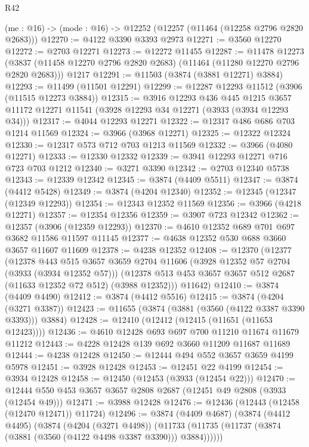 \begin{lexlean}{R42}
\begin{coremodule}
  (me : @16) -> (mode : @16) -> @12252 (@12257 (@11464 (@12258 @2796 @2820 @2683)))
@12270 := @4122 @3390 @3393 @2973
@12271 := @3560 @12270
@12272 := @2703 @12271
@12273 := @12272 @11455
@12287 := @11478
    @12273
    (@3837 (@11458 @12270 @2796 @2820 @2683) (@11464 (@11280 @12270 @2796 @2820 @2683)))
    @1217
@12291 := @11503 (@3874 (@3881 @12271) @3884)
@12293 := @11499 (@11501 @12291)
@12299 := @12287 @12293 @11512 (@3906 (@11515 @12273 @3884))
@12315 := @3916
    @12293
    @436
    @445
    @1215
    @3657
    @11172
    @12271
    @11541
    (@3928 @12293 @34 @12271 (@3933 (@3934 @12293 @34)))
@12317 := @4044 @12293 @12271
@12322 := @12317 @486 @686 @703 @1214 @11569
@12324 := @3966 (@3968 @12271)
@12325 := @12322 @12324
@12330 := @12317 @573 @712 @703 @1213 @11569
@12332 := @3966 (@4080 @12271)
@12333 := @12330 @12332
@12339 := @3941 @12293 @12271 @716 @723 @703 @1212
@12340 := @3271 @3390
@12342 := @2703 @12340 @5738
@12343 := @12339 @12342
@12345 := @3874 (@4409 @5511)
@12347 := @3874 (@4412 @5428)
@12349 := @3874 (@4204 @12340)
@12352 := @12345 (@12347 (@12349 @12293))
@12354 := @12343 @12352 @11569
@12356 := @3966 (@4218 @12271)
@12357 := @12354 @12356
@12359 := @3907 @723 @12342
@12362 := @12357 (@3906 (@12359 @12293))
@12370 := @4610 @12352 @689 @701 @697 @3682 @11586 @11597 @11145
@12377 := @4638 @12352 @530 @688 @3660 @3657 @11607 @11609
@12378 := @4238 @12352
@12408 := @12370
    (@12377
      (@12378
        @443
        @515
        @3657
        @3659
        @2704
        @11606
        (@3928 @12352 @57 @2704 (@3933 (@3934 @12352 @57)))
        (@12378 @513 @453 @3657 @3657 @512 @2687 (@11633 @12352 @72 @512) (@3988 @12352)))
      @11642)
@12410 := @3874 (@4409 @4490)
@12412 := @3874 (@4412 @5516)
@12415 := @3874 (@4204 (@3271 @3387))
@12423 := @11655 (@3874 (@3881 (@3560 (@4122 @3387 @3390 @3393))) @3884)
@12428 := @12410 (@12412 (@12415 (@11651 (@11653 @12423))))
@12436 := @4610 @12428 @693 @697 @700 @11210 @11674 @11679 @11212
@12443 := @4228 @12428 @139 @692 @3660 @11209 @11687 @11689
@12444 := @4238 @12428
@12450 := @12444 @494 @552 @3657 @3659 @4199 @5978
@12451 := @3928 @12428
@12453 := @12451 @22 @4199
@12454 := @3934 @12428
@12458 := @12450 (@12453 (@3933 (@12454 @22)))
@12470 := @12444 @550 @453 @3657 @3657 @2808 @2687 (@12451 @49 @2808 (@3933 (@12454 @49)))
@12471 := @3988 @12428
@12476 := @12436 (@12443 (@12458 (@12470 @12471)) @11724)
@12496 := @3874
    (@4409 @4687)
    (@3874
      (@4412 @4495)
      (@3874
        (@4204 (@3271 @4498))
        (@11733 (@11735 (@11737 (@3874 (@3881 (@3560 (@4122 @4498 @3387 @3390))) @3884))))))

\end{coremodule}
\end{lexlean}
